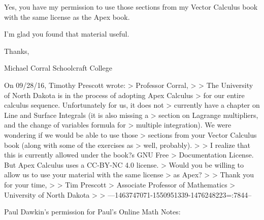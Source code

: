 \begin{itemize}
\begin{itemize}
Yes, you have my permission to use those sections from my Vector
Calculus book with the same license as the Apex book.

I'm glad you found that material useful.

Thanks,

Michael Corral
Schoolcraft College

On 09/28/16, Timothy Prescott wrote:
> Professor Corral,
> 
> The University of North Dakota is in the process of adopting Apex Calculus
> for our entire calculus sequence.  Unfortunately for us, it does not
> currently have a chapter on Line and Surface Integrals (it is also missing a
> section on Lagrange multipliers, and the change of variables formula for
> multiple integration).  We were wondering if we would be able to use those
> sections from your Vector Calculus book (along with some of the exercises as
> well, probably).
> 
> I realize that this is currently allowed under the book?s GNU Free
> Documentation License.  But Apex Calculus uses a CC-BY-NC 4.0 license. 
> Would you be willing to allow us to use your material with the same license
> as Apex?
> 
> Thank you for your time,
> 
> Tim Prescott
> Associate Professor of Mathematics
> University of North Dakota
> 
>
---1463747071-1550951339-1476248223=:7844--


Paul Dawkin's permission for Paul's Online Math Notes:


\end{itemize}
\end{itemize}
